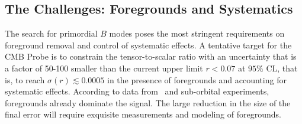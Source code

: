 

\subsection{The Challenges: Foregrounds and Systematics}
\label{sec:foregrounds_systematics}

\vspace{-0.05in}
The search for primordial $B$ modes poses the most stringent requirements on foreground removal and control of systematic effects. A tentative target for the CMB Probe is to constrain the tensor-to-scalar ratio with an 
uncertainty that is a factor of 50-100 smaller than the current upper limit \mbox{$r < 0.07$} at $95\%$ CL, that is, to reach 
$\sigma(r)\lesssim0.0005$ in the presence of foregrounds and accounting for systematic effects. According to data from \planck\ and 
sub-orbital experiments, foregrounds already dominate the signal. The large reduction in the size of 
the final error will require exquisite measurements and modeling of foregrounds. 
